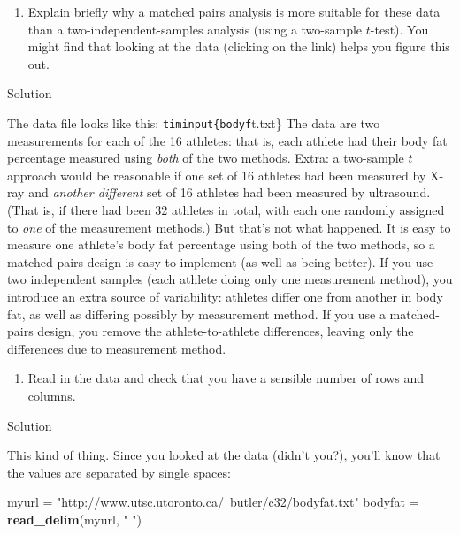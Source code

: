 \documentclass[]{tufte-book}
\newenvironment{Shaded}{}{}
\newcommand{\KeywordTok}[1]{\textcolor[rgb]{0.00,0.44,0.13}{\textbf{#1}}}
\newcommand{\NormalTok}[1]{#1}
\newcommand{\StringTok}[1]{\textcolor[rgb]{0.25,0.44,0.63}{#1}}
\providecommand{\tightlist}{%
  \setlength{\itemsep}{0pt}\setlength{\parskip}{0pt}}
\theoremstyle{definition}
\theoremstyle{definition}
\theoremstyle{definition}
\theoremstyle{remark}
\begin{document}
\begin{enumerate}
\def\labelenumi{(\alph{enumi})}
\tightlist
\item
  Explain briefly why a matched pairs analysis is more suitable for
  these data than a two-independent-samples analysis (using a two-sample
  \(t\)-test). You might find that looking at the data (clicking on the
  link) helps you figure this out.
\end{enumerate}

Solution

The data file looks like this: \texttt{timinput\{bodyf}t.txt\} The data
are two measurements for each of the 16 athletes: that is, each athlete
had their body fat percentage measured using \emph{both} of the two
methods. Extra: a two-sample \(t\) approach would be reasonable if one
set of 16 athletes had been measured by X-ray and \emph{another
different} set of 16 athletes had been measured by ultrasound. (That is,
if there had been 32 athletes in total, with each one randomly assigned
to \emph{one} of the measurement methods.) But that's not what happened.
It is easy to measure one athlete's body fat percentage using both of
the two methods, so a matched pairs design is easy to implement (as well
as being better). If you use two independent samples (each athlete doing
only one measurement method), you introduce an extra source of
variability: athletes differ one from another in body fat, as well as
differing possibly by measurement method. If you use a matched-pairs
design, you remove the athlete-to-athlete differences, leaving only the
differences due to measurement method.

\begin{enumerate}
\def\labelenumi{(\alph{enumi})}
\setcounter{enumi}{1}
\tightlist
\item
  Read in the data and check that you have a sensible number of rows and
  columns.
\end{enumerate}

Solution

This kind of thing. Since you looked at the data (didn't you?), you'll
know that the values are separated by single spaces:

\begin{Shaded}
\begin{Highlighting}[]
\NormalTok{myurl =}\StringTok{ "http://www.utsc.utoronto.ca/~butler/c32/bodyfat.txt"}
\NormalTok{bodyfat =}\StringTok{ }\KeywordTok{read_delim}\NormalTok{(myurl, }\StringTok{" "}\NormalTok{)}
\end{Highlighting}
\end{Shaded}
\end{document}
